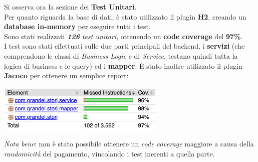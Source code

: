 \documentclass{article}
\begin{document}
Si osserva ora la sezione dei \textbf{Test Unitari}.\\
Per quanto riguarda la base di dati, è stato utilizzato il plugin \textbf{H2}, creando un \textbf{database in-memory} per eseguire tutti i test.\\
Sono stati realizzati \textit{\textbf{126} test unitari}, ottenendo un \textbf{code coverage} del \textbf{97\%}.\\
I test sono stati effettuati sulle due parti principali del backend, i \textbf{servizi} (che comprendono le classi di \textit{Business Logic} e di \textit{Service}, testano quindi tutta la logica di business e le query) ed i \textbf{mapper}. È stato inoltre utilizzato il plugin \textbf{Jacoco} per ottenere un semplice report:
\begin{center}
    \includegraphics[width=0.6\textwidth]{jacoco.png}
\end{center}
\textit{Nota bene}: non è stato possibile ottenere un \textit{code coverage} maggiore a causa della \textit{randomicità} del pagamento, vincolando i test inerenti a quella parte.
\end{document}
